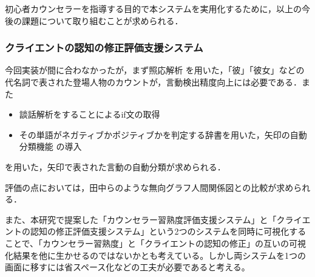 \documentclass[shuuron]{kuee}
\begin{document}
初心者カウンセラーを指導する目的で本システムを実用化するために，以上の今後の課題について取り組むことが求められる．%

\subsubsection{クライエントの認知の修正評価支援システム}

今回実装が間に合わなかったが，まず照応解析\cite{sasano2009probabilistic} \cite{sasano2011discriminative}を用いた，「彼」「彼女」などの代名詞で表された登場人物のカウントが，言動検出精度向上には必要である．また
\begin{itemize}
  \item 談話解析をすることによるif文の取得\cite{kishimoto}
  \item その単語がネガティブかポジティブかを判定する辞書を用いた，矢印の自動分類機能\cite{小林のぞみ2005意見抽出のための評価表現の収集} \cite{東山昌彦2008述語の選択選好性に着目した名詞評価極性の獲得} の導入
\end{itemize}
を用いた，矢印で表された言動の自動分類が求められる．

評価の点においては，田中ら\cite{tanaka}のような無向グラフ人間関係図との比較が求められる．

また、本研究で提案した「カウンセラー習熟度評価支援システム」と「クライエントの認知の修正評価支援システム」という2つのシステムを同時に可視化することで、「カウンセラー習熟度」と「クライエントの認知の修正」の互いの可視化結果を他に生かせるのではないかとも考えている。しかし両システムを1つの画面に移すには省スペース化などの工夫が必要であると考える。
\end{document}
